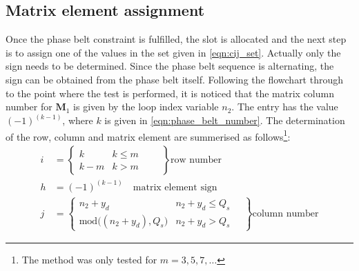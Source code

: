 \subsection{Matrix element assignment}\label{sec:m_assignment}
Once the phase belt constraint is fulfilled, the slot is allocated and the next step is to assign one of the values in the set given in \eqref{eqn:cij_set}. Actually only the sign needs to be determined. Since the phase belt sequence is alternating, the sign can be obtained from the phase belt itself. Following the flowchart through to the point where the test is performed, it is noticed that the matrix column number for $\mathbf{M}_1$ is given by the loop index variable $n_2$. The entry has the value  $(-1)^{(k-1)}$, where $k$ is given in \eqref{eqn:phase_belt_number}. The determination of the row, column and matrix element are summerised as follows\footnote{The method was only tested for $m=3,5,7,\ldots$}: 
\begin{equation}
  \label{eqn:matrix_element}
  \begin{aligned}
  i &= 
  \left\{ 
    \begin{array}{ll}
	    k   & k \leq m\\
	    k-m & k > m
	  \end{array}
	  \qquad 
	\right\}
	\mbox{row number}
	\\
	h &= (-1)^{(k-1)} 
	\quad 
	\mbox{matrix element sign} 
	\\
	j &= 
  \left\{ 
    \begin{array}{ll}
	    n_2+y_d   & n_2+y_d \leq Q_s \\
	    \mbox{mod}\bigl((n_2+y_d),Q_s\bigr) & n_2+y_d > Q_s
	  \end{array} 
	  \quad
	\right\}
	\mbox{column number}
	\end{aligned}
\end{equation}

